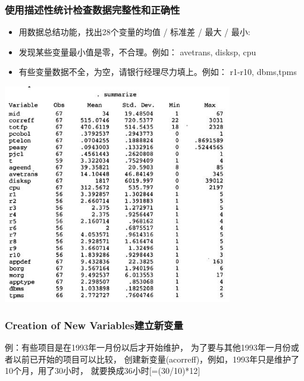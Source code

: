 \hypertarget{ux4f7fux7528ux63cfux8ff0ux6027ux7edfux8ba1ux68c0ux67e5ux6570ux636eux5b8cux6574ux6027ux548cux6b63ux786eux6027}{%
\subsubsection{使用描述性统计检查数据完整性和正确性}\label{ux4f7fux7528ux63cfux8ff0ux6027ux7edfux8ba1ux68c0ux67e5ux6570ux636eux5b8cux6574ux6027ux548cux6b63ux786eux6027}}

\begin{itemize}
\tightlist
\item
  用数据总结功能，找出28个变量的均值 / 标准差 / 最大 / 最小:
\item
  发现某些变量最小值是零，不合理。例如： avetrans, disksp, cpu
\item
  有些变量数据不全，为空，请银行经理尽力填上。例如： r1-r10, dbms,tpms
\end{itemize}


\includegraphics[width=10cm]{maxwell_e51.jpg}

\hypertarget{creation-of-new-variablesux5efaux7acbux65b0ux53d8ux91cf}{%
\subsubsection{Creation of New
Variables建立新变量}\label{creation-of-new-variablesux5efaux7acbux65b0ux53d8ux91cf}}

例：有些项目是在1993年一月份以后才开始维护，
为了要与其他1993年一月份或者以前已开始的项目可以比较，
创建新变量(acorreff)，例如，1993年只是维护了10个月，用了30小时，
就要换成36小时{[}=(30/10)*12{]}

